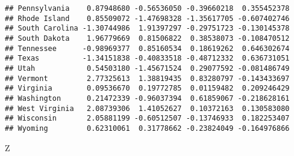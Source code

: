 \documentclass[]{article}
\newenvironment{Shaded}{\begin{snugshade}}{\end{snugshade}}
\newcommand{\NormalTok}[1]{#1}
\begin{document}
\begin{verbatim}
## Pennsylvania    0.87948680 -0.56536050 -0.39660218  0.355452378
## Rhode Island    0.85509072 -1.47698328 -1.35617705 -0.607402746
## South Carolina -1.30744986  1.91397297 -0.29751723 -0.130145378
## South Dakota    1.96779669  0.81506822  0.38538073 -0.108470512
## Tennessee      -0.98969377  0.85160534  0.18619262  0.646302674
## Texas          -1.34151838 -0.40833518 -0.48712332  0.636731051
## Utah            0.54503180 -1.45671524  0.29077592 -0.081486749
## Vermont         2.77325613  1.38819435  0.83280797 -0.143433697
## Virginia        0.09536670  0.19772785  0.01159482  0.209246429
## Washington      0.21472339 -0.96037394  0.61859067 -0.218628161
## West Virginia   2.08739306  1.41052627  0.10372163  0.130583080
## Wisconsin       2.05881199 -0.60512507 -0.13746933  0.182253407
## Wyoming         0.62310061  0.31778662 -0.23824049 -0.164976866
\end{verbatim}

\begin{Shaded}
\begin{Highlighting}[]
\NormalTok{Z}
\end{Highlighting}
\end{Shaded}
\end{document}

